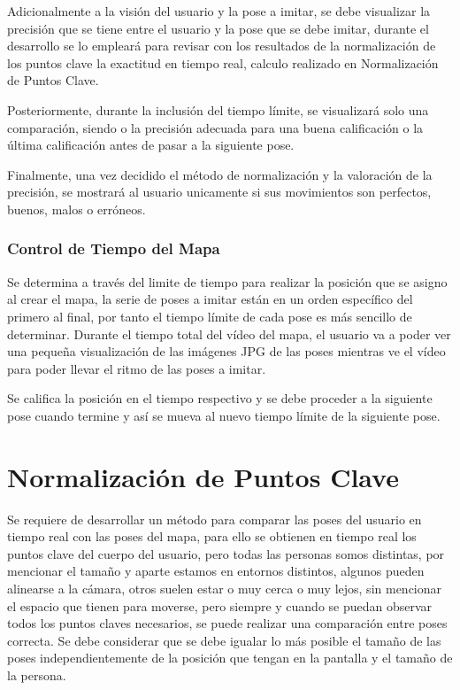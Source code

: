 Adicionalmente a la visión del usuario y la pose a imitar, se debe visualizar la precisión que se tiene entre el usuario y la pose que se debe imitar, durante el desarrollo se lo empleará para revisar con los resultados de la normalización de los puntos clave la exactitud en tiempo real, calculo realizado en Normalización de Puntos Clave. 

Posteriormente, durante la inclusión del tiempo límite, se visualizará solo una comparación, siendo o la precisión adecuada para una buena calificación o la última calificación antes de pasar a la siguiente pose.

Finalmente, una vez decidido el método de normalización y la valoración de la precisión, se mostrará al usuario unicamente si sus movimientos son perfectos, buenos, malos o erróneos.

\subsubsection{Control de Tiempo del Mapa}

Se determina a través del limite de tiempo para realizar la posición que se asigno al crear el mapa, la serie de poses a imitar están en un orden específico del primero al final, por tanto el tiempo límite de cada pose es más sencillo de determinar. Durante el tiempo total del vídeo del mapa, el usuario va a poder ver una pequeña visualización de las imágenes JPG de las poses mientras ve el vídeo para poder llevar el ritmo de las poses a imitar.

Se califica la posición en el tiempo respectivo y se debe proceder a la siguiente pose cuando termine y así se mueva al nuevo tiempo límite de la siguiente pose.


\section{Normalización de Puntos Clave}

Se requiere de desarrollar un método para comparar las poses del usuario en tiempo real con las poses del mapa, para ello se obtienen en tiempo real los puntos clave del cuerpo del usuario, pero todas las personas somos distintas, por mencionar el tamaño y aparte estamos en entornos distintos, algunos pueden alinearse a la cámara, otros suelen estar o muy cerca o muy lejos, sin mencionar el espacio que tienen para moverse, pero siempre y cuando se puedan observar todos los puntos claves necesarios, se puede realizar una comparación entre poses correcta. Se debe considerar que se debe igualar lo más posible el tamaño de las poses independientemente de la posición que tengan en la pantalla y el tamaño de la persona.

